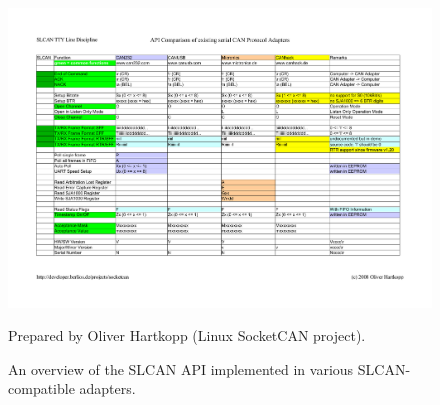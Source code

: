 \documentclass{zubaxdoc}
\begin{document}
\begin{figure}[hbtp]
    \centering
	\centerline{\includegraphics[width=1.2\textwidth]{Generic_SLCAN_API}}
	\caption{An overview of the SLCAN API implemented in various SLCAN-compatible adapters.
	\label{fig:Generic_SLCAN_API}}
	Prepared by Oliver Hartkopp (Linux SocketCAN project).
\end{figure}
\end{document}

